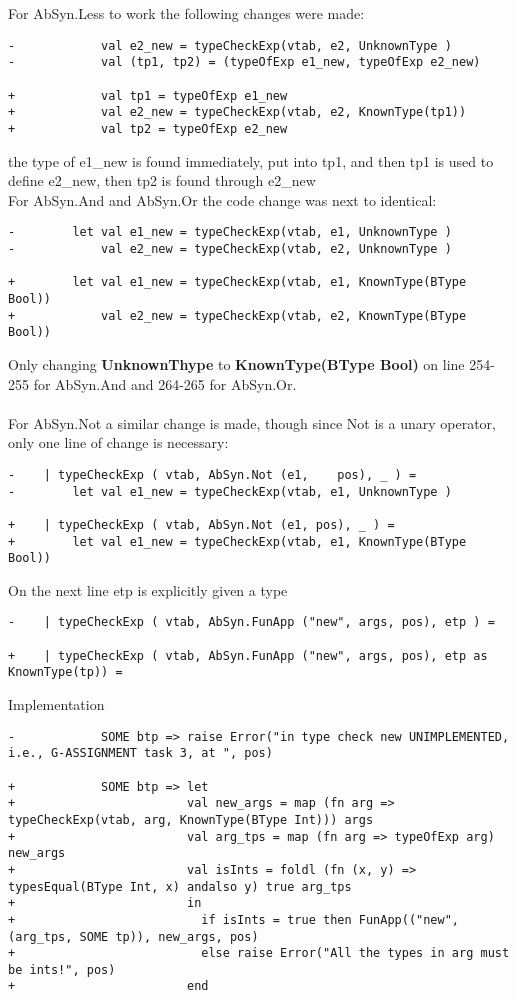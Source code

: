 For AbSyn.Less to work the following changes were made:
\begin{verbatim}
-            val e2_new = typeCheckExp(vtab, e2, UnknownType )
-            val (tp1, tp2) = (typeOfExp e1_new, typeOfExp e2_new)

+            val tp1 = typeOfExp e1_new
+            val e2_new = typeCheckExp(vtab, e2, KnownType(tp1))
+            val tp2 = typeOfExp e2_new 
\end{verbatim}
the type of e1\_new is found immediately, put into tp1, and then tp1 is used to
define e2\_new, then tp2 is found through e2\_new
\\
For AbSyn.And and AbSyn.Or the code change was next to identical:
\begin{verbatim}
-        let val e1_new = typeCheckExp(vtab, e1, UnknownType )
-            val e2_new = typeCheckExp(vtab, e2, UnknownType )

+        let val e1_new = typeCheckExp(vtab, e1, KnownType(BType Bool))
+            val e2_new = typeCheckExp(vtab, e2, KnownType(BType Bool))
\end{verbatim}
Only changing \textbf{UnknownThype} to \textbf{KnownType(BType Bool)} on line
254-255 for AbSyn.And and 264-265 for AbSyn.Or.\\
\\
For AbSyn.Not a similar change is made, though since Not is a unary operator,
only one line of change is necessary:
\begin{verbatim}
-    | typeCheckExp ( vtab, AbSyn.Not (e1,    pos), _ ) =
-        let val e1_new = typeCheckExp(vtab, e1, UnknownType )

+    | typeCheckExp ( vtab, AbSyn.Not (e1, pos), _ ) =
+        let val e1_new = typeCheckExp(vtab, e1, KnownType(BType Bool))
\end{verbatim}
On the next line etp is explicitly given a type
\begin{verbatim}
-    | typeCheckExp ( vtab, AbSyn.FunApp ("new", args, pos), etp ) =

+    | typeCheckExp ( vtab, AbSyn.FunApp ("new", args, pos), etp as KnownType(tp)) =
\end{verbatim}
Implementation 
\begin{verbatim}
-            SOME btp => raise Error("in type check new UNIMPLEMENTED, i.e., G-ASSIGNMENT task 3, at ", pos)

+            SOME btp => let
+                        val new_args = map (fn arg => typeCheckExp(vtab, arg, KnownType(BType Int))) args
+                        val arg_tps = map (fn arg => typeOfExp arg) new_args
+                        val isInts = foldl (fn (x, y) => typesEqual(BType Int, x) andalso y) true arg_tps 
+                        in
+                          if isInts = true then FunApp(("new", (arg_tps, SOME tp)), new_args, pos)
+                          else raise Error("All the types in arg must be ints!", pos)
+                        end
\end{verbatim}
